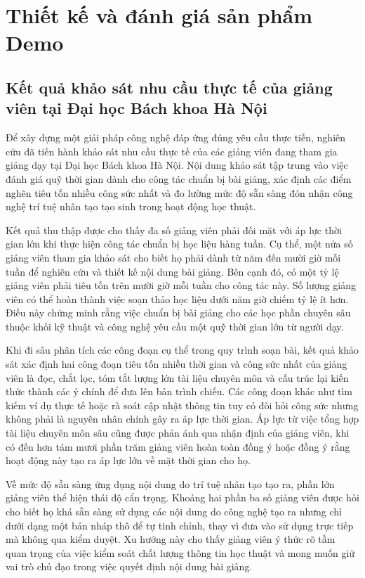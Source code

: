 \section{Thiết kế và đánh giá sản phẩm Demo}

\subsection{Kết quả khảo sát nhu cầu thực tế của giảng viên tại Đại học Bách khoa Hà Nội}
Để xây dựng một giải pháp công nghệ đáp ứng đúng yêu cầu thực tiễn, nghiên cứu đã tiến hành khảo sát nhu cầu thực tế của các giảng viên đang tham gia giảng dạy tại Đại học Bách khoa Hà Nội. Nội dung khảo sát tập trung vào việc đánh giá quỹ thời gian dành cho công tác chuẩn bị bài giảng, xác định các điểm nghẽn tiêu tốn nhiều công sức nhất và đo lường mức độ sẵn sàng đón nhận công nghệ trí tuệ nhân tạo tạo sinh trong hoạt động học thuật.

Kết quả thu thập được cho thấy đa số giảng viên phải đối mặt với áp lực thời gian lớn khi thực hiện công tác chuẩn bị học liệu hàng tuần. Cụ thể, một nửa số giảng viên tham gia khảo sát cho biết họ phải dành từ năm đến mười giờ mỗi tuần để nghiên cứu và thiết kế nội dung bài giảng. Bên cạnh đó, có một tỷ lệ giảng viên phải tiêu tốn trên mười giờ mỗi tuần cho công tác này. Số lượng giảng viên có thể hoàn thành việc soạn thảo học liệu dưới năm giờ chiếm tỷ lệ ít hơn. Điều này chứng minh rằng việc chuẩn bị bài giảng cho các học phần chuyên sâu thuộc khối kỹ thuật và công nghệ yêu cầu một quỹ thời gian lớn từ người dạy.

Khi đi sâu phân tích các công đoạn cụ thể trong quy trình soạn bài, kết quả khảo sát xác định hai công đoạn tiêu tốn nhiều thời gian và công sức nhất của giảng viên là đọc, chắt lọc, tóm tắt lượng lớn tài liệu chuyên môn và cấu trúc lại kiến thức thành các ý chính để đưa lên bản trình chiếu. Các công đoạn khác như tìm kiếm ví dụ thực tế hoặc rà soát cập nhật thông tin tuy có đòi hỏi công sức nhưng không phải là nguyên nhân chính gây ra áp lực thời gian. Áp lực từ việc tổng hợp tài liệu chuyên môn sâu cũng được phản ánh qua nhận định của giảng viên, khi có đến hơn tám mươi phần trăm giảng viên hoàn toàn đồng ý hoặc đồng ý rằng hoạt động này tạo ra áp lực lớn về mặt thời gian cho họ.

Về mức độ sẵn sàng ứng dụng nội dung do trí tuệ nhân tạo tạo ra, phần lớn giảng viên thể hiện thái độ cẩn trọng. Khoảng hai phần ba số giảng viên được hỏi cho biết họ khá sẵn sàng sử dụng các nội dung do công nghệ tạo ra nhưng chỉ dưới dạng một bản nháp thô để tự tinh chỉnh, thay vì đưa vào sử dụng trực tiếp mà không qua kiểm duyệt. Xu hướng này cho thấy giảng viên ý thức rõ tầm quan trọng của việc kiểm soát chất lượng thông tin học thuật và mong muốn giữ vai trò chủ đạo trong việc quyết định nội dung bài giảng.

